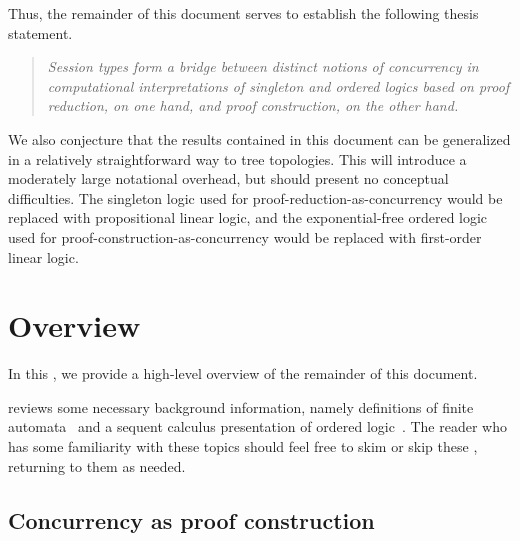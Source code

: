 Thus, the remainder of this document serves to establish the following thesis statement.
\begin{quotation}
  \normalsize
  \itshape Session types form a bridge between distinct notions of concurrency in computational interpretations of singleton and ordered logics based on proof reduction, on one hand, and proof construction, on the other hand.
\end{quotation}

We also conjecture that the results contained in this document can be generalized in a relatively straightforward way to tree topologies.
This will introduce a moderately large notational overhead, but should present no conceptual difficulties.
The singleton logic used for proof-reduction-as-concurrency would be replaced with propositional linear logic, and the exponential-free ordered logic used for proof-construction-as-concurrency would be replaced with first-order linear logic.

\section{Overview}\label{sec:introduction:overview}

In this , we provide a high-level overview of the remainder of this document.

 reviews some necessary background information, namely definitions of finite automata~ and a sequent calculus presentation of ordered logic\autocite{Polakow+Pfenning:MFPS99}~.
The reader who has some familiarity with these topics should feel free to skim or skip these , returning to them as needed.

\subsection{Concurrency as proof construction}

